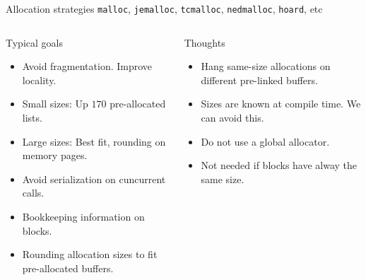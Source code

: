 \documentclass[10pt,aspectratio=169]{beamer}
\begin{document}
\begin{frame}[]{Allocation strategies}
{\texttt{malloc}, \texttt{jemalloc}, \texttt{tcmalloc},
\texttt{nedmalloc}, \texttt{hoard}, etc}
\begin{columns}
\begin{column}{0.5\textwidth}
Typical goals
\begin{itemize}
\item<alert@1> Avoid fragmentation. Improve locality.
\item<alert@2> Small sizes: Up $170$ pre-allocated lists.
\item<alert@3> Large sizes: Best fit, rounding on memory pages.
\item<alert@4> Avoid serialization on cuncurrent calls.
\item<alert@5> Bookkeeping information on blocks.
\item<alert@2> Rounding allocation sizes to fit pre-allocated buffers.
\end{itemize}

\end{column}

\begin{column}{0.5\textwidth}
Thoughts
\begin{itemize}
\item<alert@1> Hang same-size allocations on different pre-linked buffers.
\item<alert@2> Sizes are known at compile time. We can avoid this.
\item<alert@3> Do not use a global allocator.
\item<alert@4> Not needed if blocks have alway the same size.
\end{itemize}

\end{column}
\end{columns}
\end{frame}
\end{document}
